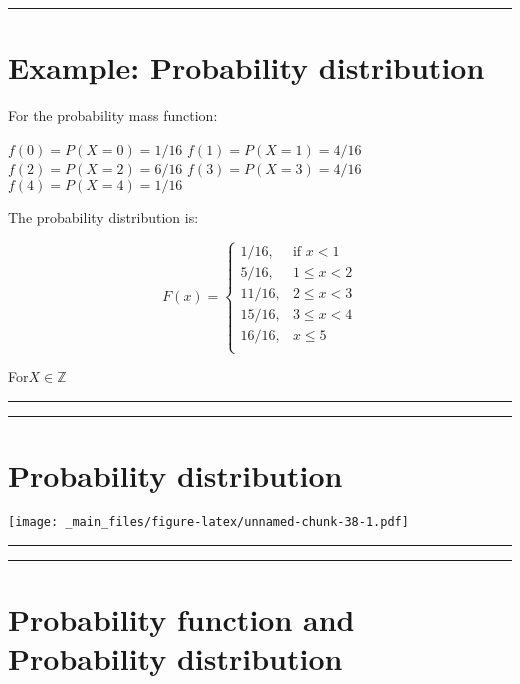 \documentclass[
]{book}
\begin{document}
\begin{center}\rule{0.5\linewidth}{0.5pt}\end{center}

\hypertarget{example-probability-distribution}{%
\section{Example: Probability distribution}\label{example-probability-distribution}}

For the probability mass function:

\(f(0)=P(X=0)=1/16\)
\(f(1)=P(X=1)=4/16\)
\(f(2)=P(X=2)=6/16\)
\(f(3)=P(X=3)=4/16\)
\(f(4)=P(X=4)=1/16\)

The probability distribution is:

\[
    F(x)=
\begin{cases}
    1/16,& \text{if } x < 1\\
    5/16,& 1\leq x < 2\\
    11/16,& 2\leq x < 3\\
    15/16,& 3\leq x < 4\\
    16/16,&  x \leq 5\\
\end{cases}
\]

For\(X \in \mathbb{Z}\)

\begin{center}\rule{0.5\linewidth}{0.5pt}\end{center}

\begin{center}\rule{0.5\linewidth}{0.5pt}\end{center}

\hypertarget{probability-distribution-1}{%
\section{Probability distribution}\label{probability-distribution-1}}

\texttt{[image: \_main\_files/figure-latex/unnamed-chunk-38-1.pdf]}

\begin{center}\rule{0.5\linewidth}{0.5pt}\end{center}

\begin{center}\rule{0.5\linewidth}{0.5pt}\end{center}

\hypertarget{probability-function-and-probability-distribution}{%
\section{Probability function and Probability distribution}\label{probability-function-and-probability-distribution}}
\end{document}
